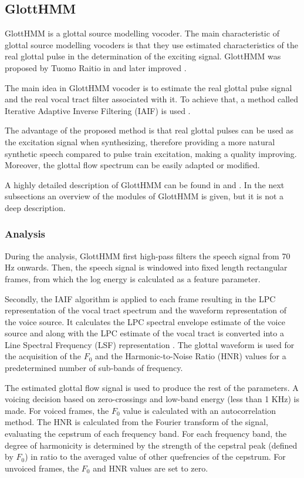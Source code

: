\subsection{GlottHMM}
\label{vocoders_glott}
GlottHMM is a glottal source modelling vocoder.
%
The main characteristic of glottal source modelling vocoders is that they use estimated characteristics of the real glottal pulse in the determination of the exciting signal.
%
GlottHMM was proposed by Tuomo Raitio in \cite{TuomoMSc} and later improved \cite{raitio_tasl}.

The main idea in GlottHMM vocoder is to estimate the real glottal pulse signal and the real vocal tract filter associated with it.
%
To achieve that, a method called Iterative Adaptive Inverse Filtering (IAIF) is used \cite{alku1992glottal}.
%

The advantage of the proposed method is that real glottal pulses can be used as the excitation signal when synthesizing, therefore providing a more natural synthetic speech compared to pulse train excitation, making a quality improving.
%
Moreover, the glottal flow spectrum can be easily adapted or modified.

A highly detailed description of GlottHMM can be found in \cite{TuomoMSc} and \cite{manuMSc}.
%
In the next subsections an overview of the modules of GlottHMM is given, but it is not a deep description.

\subsubsection{Analysis}
\label{vocoders_glott_analysis}
During the analysis, GlottHMM first high-pass filters the speech signal from 70 Hz onwards.
%
Then, the speech signal is windowed into fixed length rectangular frames, from which the log energy is calculated as a feature parameter.

Secondly, the IAIF algorithm is applied to each frame resulting in the LPC representation of the vocal tract spectrum and the waveform representation of the voice source.
%
It calculates the LPC spectral envelope estimate of the voice source and along with the LPC estimate of the vocal tract is converted into a Line Spectral Frequency (LSF) representation \cite{manuMSc}.
%
The glottal waveform is used for the acquisition of the $F_{0}$ and the Harmonic-to-Noise Ratio (HNR) values for a predetermined number of sub-bands of frequency.

The estimated glottal flow signal is used to produce the rest of the parameters. A voicing decision based on zero-crossings and low-band energy (less than 1 KHz) is made.
%
For voiced frames, the $F_{0}$ value is calculated with an autocorrelation method.
%
The HNR is calculated from the Fourier transform of the signal, evaluating the cepstrum of each frequency band.
%
For each frequency band, the degree of harmonicity is determined by the strength of the cepstral peak (defined by $F_{0}$) in ratio to the averaged value of other quefrencies of the cepstrum. 
%
For unvoiced frames, the $F_{0}$ and HNR values are set to zero.


